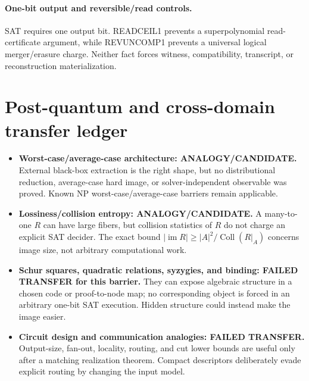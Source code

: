 \documentclass[11pt]{article}
\begin{document}
\paragraph{One-bit output and reversible/read controls.}
SAT requires one output bit.  READCEIL1 prevents a superpolynomial
read-certificate argument, while REVUNCOMP1 prevents a universal logical
merger/erasure charge.  Neither fact forces witness, compatibility, transcript,
or reconstruction materialization.

\section*{Post-quantum and cross-domain transfer ledger}
\begin{itemize}
\item \textbf{Worst-case/average-case architecture: ANALOGY/CANDIDATE.}
External black-box extraction is the right shape, but no distributional
reduction, average-case hard image, or solver-independent observable was
proved.  Known NP worst-case/average-case barriers remain applicable.
\item \textbf{Lossiness/collision entropy: ANALOGY/CANDIDATE.}
A many-to-one $R$ can have large fibers, but collision statistics of $R$ do
not charge an explicit SAT decider.  The exact bound
$|\operatorname{im}R|\ge |A|^2/\operatorname{Coll}(R|_A)$ concerns image
size, not arbitrary computational work.
\item \textbf{Schur squares, quadratic relations, syzygies, and binding:
FAILED TRANSFER for this barrier.}  They can expose algebraic structure in a
chosen code or proof-to-node map; no corresponding object is forced in an
arbitrary one-bit SAT execution.  Hidden structure could instead make the
image easier.
\item \textbf{Circuit design and communication analogies: FAILED TRANSFER.}
Output-size, fan-out, locality, routing, and cut lower bounds are useful only
after a matching realization theorem.  Compact descriptors deliberately evade
explicit routing by changing the input model.
\end{itemize}
\end{document}

